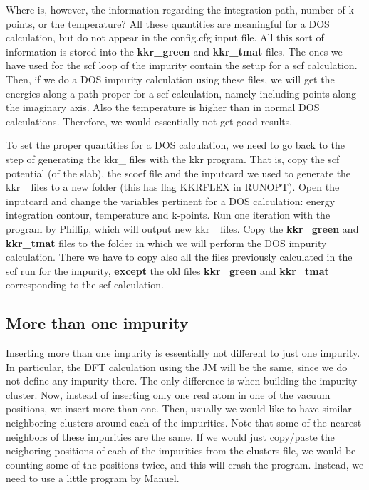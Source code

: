\documentclass[a4paper,10pt,fullpage]{report}
\begin{document}
Where is, however, the information regarding the integration path, number of k-points,
or the temperature? All these quantities are meaningful for a DOS calculation,
but do not appear in the config.cfg input file. All this sort of information
is stored into the \textbf{kkr\_green} and \textbf{kkr\_tmat} files. 
The ones we have used for the scf loop of the impurity contain the setup for a 
scf calculation. Then, if we do a DOS impurity calculation using these files, we 
will get the energies along a path proper for a scf calculation, namely including points along
the imaginary axis. Also the temperature is higher than in normal DOS calculations.
Therefore, we would essentially not get good results.

To set the proper quantities for a DOS calculation, we need to go back to the 
step of generating the kkr\_ files with the kkr program. 
That is, copy the scf potential (of the slab), the scoef file and the inputcard 
we used to generate the kkr\_ files to a new folder (this has flag KKRFLEX in RUNOPT).
Open the inputcard and change the variables pertinent for a DOS calculation:
energy integration contour, temperature and k-points. Run
one iteration with the program by Phillip, which will output
new kkr\_ files. Copy the \textbf{kkr\_green} and \textbf{kkr\_tmat} files
to the folder in which we will perform the DOS impurity calculation.
There we have to copy also all the files previously calculated in the scf
run for the impurity, \textbf{except} the old files \textbf{kkr\_green} and \textbf{kkr\_tmat}
corresponding to the scf calculation.


\subsection{More than one impurity}

Inserting more than one impurity is essentially not different to 
just one impurity. In particular, the DFT calculation using the JM will be the same,
since we do not define any impurity there.
The only difference is when building the impurity cluster. 
Now, instead of inserting only one real atom in one of the vacuum positions, 
we insert more than one. Then, usually we would like to have similar neighboring clusters
around each of the impurities. Note that some of the nearest neighbors of
these impurities are the same. If we would just copy/paste the neighoring positions
of each of the impurities from the clusters file, we would be counting some of the
positions twice, and this will crash the program. 
Instead, we need to use a little program by Manuel. 
\end{document}

